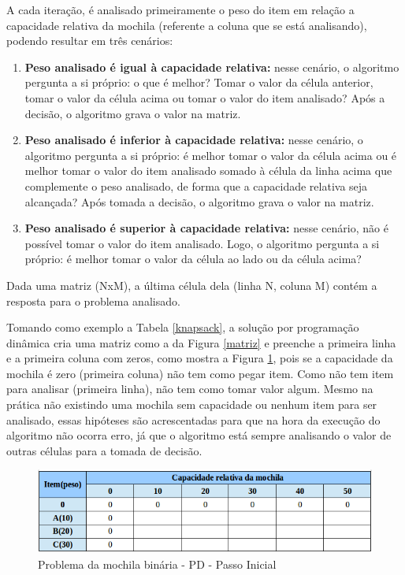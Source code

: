\begin{itemize}
A cada iteração, é analisado primeiramente o peso do item em relação a capacidade relativa da mochila (referente a coluna que se está analisando), podendo resultar em três cenários: 
\begin{enumerate}
\item \textbf{Peso analisado é igual à capacidade relativa:} nesse cenário, o algoritmo pergunta a si próprio: o que é melhor? Tomar o valor da célula anterior, tomar o valor da célula acima ou tomar o valor do item analisado? Após a decisão, o algoritmo grava o valor na matriz.
\item \textbf{Peso analisado é inferior à capacidade relativa:} nesse cenário, o algoritmo pergunta a si próprio: é melhor tomar o valor da célula acima ou é melhor tomar o valor do item analisado somado à célula da linha acima que complemente o peso analisado, de forma que a capacidade relativa seja alcançada? Após tomada a decisão, o algoritmo grava o valor na matriz. 
\item \textbf{Peso analisado é superior à capacidade relativa:} nesse cenário, não é possível tomar o valor do item analisado. Logo, o algoritmo pergunta a si próprio: é melhor tomar o valor da célula ao lado ou da célula acima? 
\end{enumerate}

Dada uma matriz (NxM), a última célula dela (linha N, coluna M) contém a resposta para o problema analisado. 

Tomando como exemplo a Tabela \ref{knapsack}, a solução por programação dinâmica cria uma matriz como a da Figura \ref{matriz} e preenche a primeira linha e a primeira coluna com zeros, como mostra a Figura \ref{matrizZero}, pois se a capacidade da mochila é zero (primeira coluna) não tem como pegar item. Como não tem item para analisar (primeira linha), não tem como tomar valor algum. Mesmo na prática não existindo uma mochila sem capacidade ou nenhum item para ser analisado, essas hipóteses são acrescentadas para que na hora da execução do algoritmo não ocorra erro, já que o algoritmo está sempre analisando o valor de outras células para a tomada de decisão.

\FloatBarrier
\begin{figure}[!h]
\centering
\includegraphics[keepaspectratio=true,scale=0.5]{figuras/matrizZero.png}
\caption{Problema da mochila binária - PD - Passo Inicial}
\label{matrizZero}
\end{figure}


\end{itemize}
